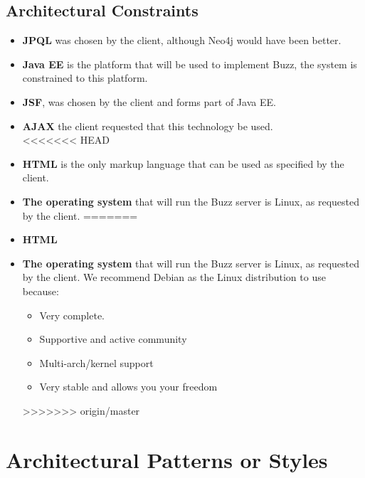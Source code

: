 \documentclass[a4paper,12pt,titlepage]{article}
\begin{document}
\subsection{Architectural Constraints}
	\begin{itemize}
		\item\textbf{JPQL} was chosen by the client, although Neo4j would have been better. \\ 
		\item\textbf{Java EE} is the platform that will be used to implement Buzz, the system is constrained to this platform. \\ 
		\item\textbf{JSF}, was chosen by the client and forms part of Java EE. \\ 
		\item\textbf{AJAX} the client requested that this technology be used.  \\ 
<<<<<<< HEAD
		\item\textbf{HTML} is the only markup language that can be used as specified by the client.\\
		\item\textbf{The operating system} that will run the Buzz server is Linux, as requested by the client.
=======
		\item\textbf{HTML} \\
		\item\textbf{The operating system} that will run the Buzz server is Linux, as requested by the client. We recommend Debian as the Linux distribution to use because:  
		\begin{itemize}
			\item Very complete.
			\item Supportive and active community 
			\item Multi-arch/kernel support
			\item Very stable and allows you your freedom
		\end{itemize}
>>>>>>> origin/master
		\end{itemize}
\newpage
\section{Architectural Patterns or Styles}%

\newpage
\end{document}
